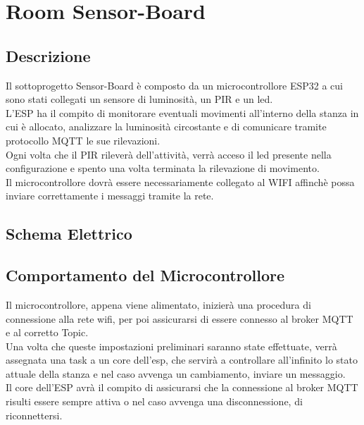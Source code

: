 \documentclass[a4paper]{report}
\begin{document}
\chapter{Room Sensor-Board}
\section{Descrizione}
Il sottoprogetto Sensor-Board è composto da un microcontrollore ESP32 a cui sono stati collegati un sensore di luminosità, un PIR e un led. \\
L'ESP ha il compito di monitorare eventuali movimenti all'interno della stanza in cui è allocato, analizzare la luminosità circostante e di comunicare tramite protocollo MQTT le sue rilevazioni. \\ 
Ogni volta che il PIR rileverà dell'attività, verrà acceso il led presente nella configurazione e spento una volta terminata la rilevazione di movimento. \\
Il microcontrollore dovrà essere necessariamente collegato al WIFI affinchè possa inviare correttamente i messaggi tramite la rete.

\vspace{2cm}

\section{Schema Elettrico}


\begin{center}
\end{center}

\newpage
\section{Comportamento del Microcontrollore}
Il microcontrollore, appena viene alimentato, inizierà una procedura di connessione alla rete wifi, per poi assicurarsi di essere connesso al broker MQTT e al corretto Topic. \\
Una volta che queste impostazioni preliminari saranno state effettuate, verrà assegnata una task a un core dell'esp, che servirà a controllare all'infinito lo stato attuale della stanza e nel caso avvenga un cambiamento, inviare un messaggio.\\
Il core dell'ESP avrà il compito di assicurarsi che la connessione al broker MQTT risulti essere sempre attiva o nel caso avvenga una disconnessione, di riconnettersi. 
\end{document}
